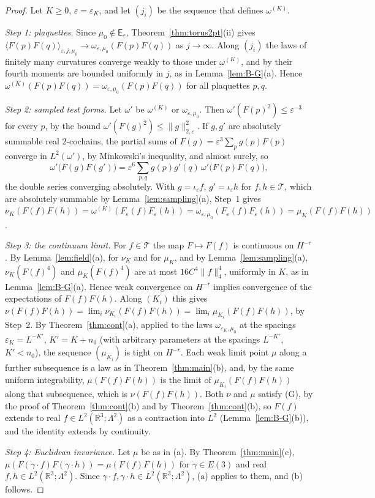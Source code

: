 \documentclass[11pt]{amsart}
\theoremstyle{plain}
\theoremstyle{definition}
\theoremstyle{remark}
\numberwithin{equation}{section}
\newcommand{\R}{\mathbb{R}}
\newcommand{\eps}{\varepsilon}
\newcommand{\cT}{\mathcal{T}}
\newcommand{\Eu}{E(3)}
\newcommand{\norm}[1]{\lVert #1\rVert}
\newcommand{\ev}[1]{\langle #1\rangle}
\begin{document}
\begin{proof}
Let $K\ge0$, $\eps=\eps_K$, and let $(j_i)$ be the sequence that defines $\omega^{(K)}$.

\emph{Step 1: plaquettes.} Since $\mu_0\notin\mathsf E_\eps$, Theorem~\ref{thm:torus2pt}(ii) gives $\ev{F(p)F(q)}_{\eps,j,\mu_0}\to\omega_{\eps,\mu_0}(F(p)F(q))$ as $j\to\infty$. Along $(j_i)$ the laws of finitely many curvatures converge weakly to those under $\omega^{(K)}$, and by \cite[Lemma~7.3]{v1} their fourth moments are bounded uniformly in $j$, as in Lemma~\ref{lem:B-G}(a). Hence $\omega^{(K)}(F(p)F(q))=\omega_{\eps,\mu_0}(F(p)F(q))$ for all plaquettes $p,q$.

\emph{Step 2: sampled test forms.} Let $\omega'$ be $\omega^{(K)}$ or $\omega_{\eps,\mu_0}$. Then $\omega'(F(p)^2)\le\eps^{-3}$ for every $p$, by the bound $\omega'(F(g)^2)\le\norm g^2_{2,\eps}$. If $g,g'$ are absolutely summable real $2$-cochains, the partial sums of $F(g)=\eps^3\sum_pg(p)F(p)$ converge in $L^2(\omega')$, by Minkowski's inequality, and almost surely, so
\[
\omega'\big(F(g)F(g')\big)=\eps^6\sum_{p,q}g(p)g'(q)\,\omega'\big(F(p)F(q)\big),
\]
the double series converging absolutely. With $g=\iota_\eps f$, $g'=\iota_\eps h$ for $f,h\in\cT$, which are absolutely summable by Lemma~\ref{lem:sampling}(a), Step~1 gives $\nu_K(F(f)F(h))=\omega^{(K)}(F_\eps(f)F_\eps(h))=\omega_{\eps,\mu_0}(F_\eps(f)F_\eps(h))=\mu_K(F(f)F(h))$.

\emph{Step 3: the continuum limit.} For $f\in\cT$ the map $F\mapsto F(f)$ is continuous on $H^{-r}$. By Lemma~\ref{lem:field}(a), for $\nu_K$ and for $\mu_K$, and by Lemma~\ref{lem:sampling}(a), $\nu_K(F(f)^4)$ and $\mu_K(F(f)^4)$ are at most $16C^4\norm f_4^4$, uniformly in $K$, as in Lemma~\ref{lem:B-G}(a). Hence weak convergence on $H^{-r}$ implies convergence of the expectations of $F(f)F(h)$. Along $(K_i)$ this gives $\nu(F(f)F(h))=\lim_i\nu_{K_i}(F(f)F(h))=\lim_i\mu_{K_i}(F(f)F(h))$, by Step~2. By Theorem~\ref{thm:cont}(a), applied to the laws $\omega_{\eps_K,\mu_0}$ at the spacings $\eps_K=L^{-K'}$, $K'=K+n_0$ (with arbitrary parameters at the spacings $L^{-K'}$, $K'<n_0$), the sequence $(\mu_{K_i})$ is tight on $H^{-r}$. Each weak limit point $\mu$ along a further subsequence is a law as in Theorem~\ref{thm:main}(b), and, by the same uniform integrability, $\mu(F(f)F(h))$ is the limit of $\mu_{K_i}(F(f)F(h))$ along that subsequence, which is $\nu(F(f)F(h))$. Both $\nu$ and $\mu$ satisfy (G), by the proof of Theorem~\ref{thm:cont}(b) and by Theorem~\ref{thm:cont}(b), so $F(f)$ extends to real $f\in L^2(\R^3;\Lambda^2)$ as a contraction into $L^2$ (Lemma~\ref{lem:B-G}(b)), and the identity extends by continuity.

\emph{Step 4: Euclidean invariance.} Let $\mu$ be as in (a). By Theorem~\ref{thm:main}(c), $\mu(F(\gamma\cdot f)F(\gamma\cdot h))=\mu(F(f)F(h))$ for $\gamma\in\Eu$ and real $f,h\in L^2(\R^3;\Lambda^2)$. Since $\gamma\cdot f,\gamma\cdot h\in L^2(\R^3;\Lambda^2)$, (a) applies to them, and (b) follows.
\end{proof}
\end{document}
